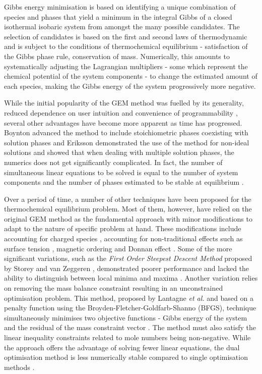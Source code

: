 	Gibbs energy minimisation is based on identifying a unique combination of species and phases that yield a minimum in the integral Gibbs of a closed isothermal isobaric system from amongst the many possible candidates. The selection of candidates is based on the first and second laws of thermodynamic and is subject to the conditions of thermochemical equilibrium - satisfaction of the Gibbs phase rule, conservation of mass. Numerically, this amounts to systematically adjusting the Lagrangian multipliers - some which represent the chemical potential of the system components - to change the estimated amount of each species, making the Gibbs energy of the system progressively more negative.

	While the initial popularity of the GEM method was fuelled by its generality,  reduced dependence on user intuition and convenience of programmability \cite{Zeleznik:1968aa}, several other advantages have become more apparent as time has progressed. Boynton advanced the method to include stoichiometric phases coexisting with solution phases \cite{Boynton:1960aa} and Eriksson \cite{Eriksson:1975aa} demonstrated the use of the method for non-ideal solutions and showed that when dealing with multiple solution phases, the numerics does not get significantly complicated. In fact, the number of simultaneous linear equations to be solved is equal to the number of system components and the number of phases estimated to be stable at equilibrium \cite{vanZeggeren11,Boynton:1960aa,Eriksson:1975aa,Eriksson73}.

	Over a period of time, a number of other techniques have been proposed for the thermochemical equilibrium problem. Most of them, however, have relied on the original GEM method \cite{White:58} as the fundamental approach with minor modifications to adapt to the nature of specific problem at hand. These modifications include accounting for charged species \cite{ERIKSSON1979375}, accounting for non-traditional effects such as surface tension \cite{KOUKKARI200618}, magnetic ordering \cite{Eriksson90} and Donnan effect \cite{PAJARRE200658}. Some of the more significant variations, such as the \emph{First Order Steepest Descent Method} proposed by Storey and van Zeggeren \cite{Storey:1964aa}, demonstrated poorer performance and lacked the ability to distinguish between local minima and maxima \cite{Storey:1964aa,vanZeggeren11}. Another variation relies on removing the mass balance constraint resulting in an unconstrained optimisation problem. This method, proposed by Lantagne \textit{et al.} and based on a penalty function using the Broyden-Fletcher-Goldfarb-Shanno (BFGS), technique simultaneously minimises two objective functions - Gibbs energy of the system and the residual of the mass constraint vector \cite{LANTAGNE1988589,Nocedal06}. The method must also satisfy the linear inequality constraints related to mole numbers being non-negative. While the approach offers the advantage of solving fewer linear equations, the dual optimisation method is less numerically stable compared to single optimisation methods \cite{Nocedal06}.

